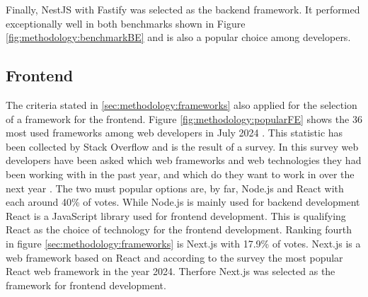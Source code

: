 Finally, NestJS \cite{methodology:nestjs} with Fastify was selected as the backend framework. It performed exceptionally well in both benchmarks shown in Figure \ref{fig:methodology:benchmarkBE} and is also a popular choice among developers.

\subsection{Frontend}
\label{subsec:methodology:frameworks:frontend}
The criteria stated in \ref{sec:methodology:frameworks} also applied for the selection of a framework for the frontend. Figure \ref{fig:methodology:popularFE} shows the 36 most used frameworks among web developers in July 2024 \cite{frontend:popularity}. This statistic has been collected by Stack Overflow and is the result of a survey. In this survey web developers have been asked which web frameworks and web technologies they had been working with in the past year, and which do they want to work in over the next year \cite{frontend:popularity}. The two must popular options are, by far, Node.js and React with each around 40\% of votes. While Node.js is mainly used for backend development React is a JavaScript library used for frontend development. This is qualifying React as the choice of technology for the frontend development. Ranking fourth in figure \ref{sec:methodology:frameworks} is Next.js with 17.9\% of votes. Next.js is a web framework based on React \cite{methodology:nextjs} and according to the survey the most popular React web framework in the year 2024. Therfore Next.js was selected as the framework for frontend development.

